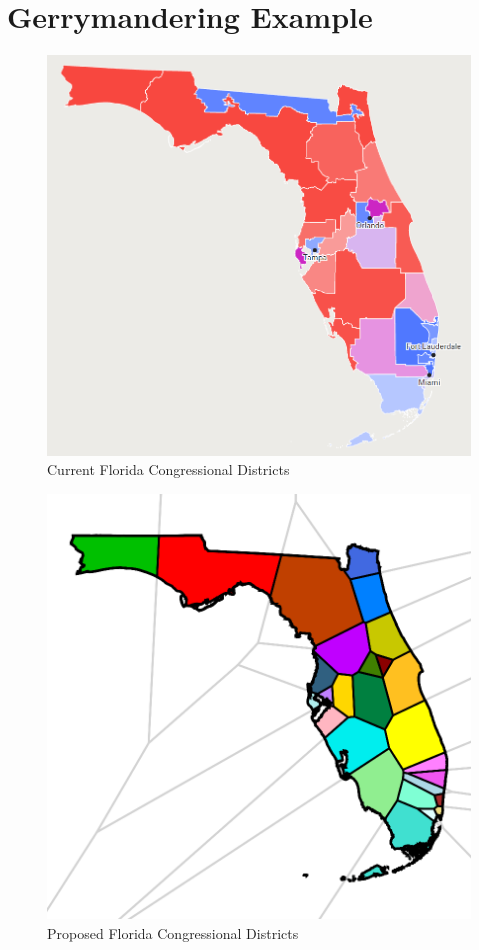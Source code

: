 \documentclass[11pt]{article}
\begin{document}
\section{Gerrymandering Example}

\begin{figure}[H]
\centering
\includegraphics[scale=0.65]{FloridaCurrent.png}
\caption{Current Florida Congressional Districts\cite{florida_districts}}
\end{figure}

\begin{figure}[H]
\centering
\includegraphics[scale=0.65]{FloridaNew.png}
\caption{Proposed Florida Congressional Districts}
\end{figure}
\end{document}

